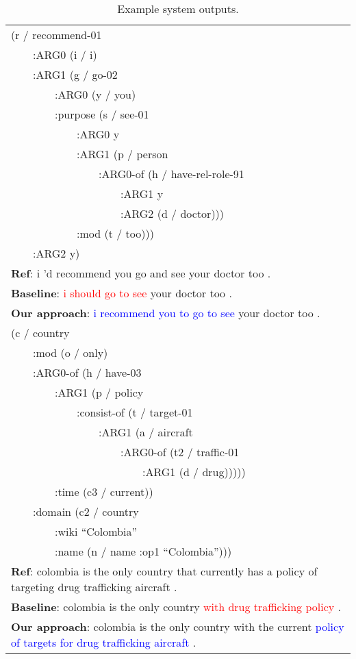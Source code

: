 \documentclass[11pt,a4paper]{article}
\begin{document}
\begin{table}[t!] \fontsize{10}{11} \selectfont
    \centering
    \begin{tabularx}{0.96\linewidth}{X}
     \toprule
     (r / recommend-01 \\
     ~~~~:ARG0 (i / i) \\
     ~~~~:ARG1 (g / go-02 \\
     ~~~~~~~~:ARG0 (y / you) \\
     ~~~~~~~~:purpose (s / see-01 \\
     ~~~~~~~~~~~~:ARG0 y \\
     ~~~~~~~~~~~~:ARG1 (p / person \\
     ~~~~~~~~~~~~~~~~:ARG0-of (h / have-rel-role-91 \\
     ~~~~~~~~~~~~~~~~~~~~:ARG1 y \\
     ~~~~~~~~~~~~~~~~~~~~:ARG2 (d / doctor))) \\
     ~~~~~~~~~~~~:mod (t / too))) \\
     ~~~~:ARG2 y) \\
     \textbf{Ref}: i 'd recommend you go and see your doctor too . \\
     \textbf{Baseline}: \textcolor{red}{i should go to see} your doctor too . \\
     \textbf{Our approach}: \textcolor{blue}{i recommend you to go to see} your doctor too . \\
     \midrule
     (c / country \\
     ~~~~:mod (o / only) \\
     ~~~~:ARG0-of (h / have-03 \\
     ~~~~~~~~:ARG1 (p / policy \\
     ~~~~~~~~~~~~:consist-of (t / target-01 \\
     ~~~~~~~~~~~~~~~~:ARG1 (a / aircraft \\
     ~~~~~~~~~~~~~~~~~~~~:ARG0-of (t2 / traffic-01 \\ 
     ~~~~~~~~~~~~~~~~~~~~~~~~:ARG1 (d / drug))))) \\
     ~~~~~~~~:time (c3 / current)) \\
     ~~~~:domain (c2 / country \\
     ~~~~~~~~:wiki ``Colombia'' \\
     ~~~~~~~~:name (n / name :op1 ``Colombia''))) \\
     \textbf{Ref}: colombia is the only country that currently has a policy of targeting drug trafficking aircraft .\\
     \textbf{Baseline}: colombia is the only country \textcolor{red}{with drug trafficking policy} .\\
     \textbf{Our approach}: colombia is the only country with the current \textcolor{blue}{policy of targets for drug trafficking aircraft} . \\
     \bottomrule
    \end{tabularx}
    \caption{Example system outputs.}
    \label{tab:case_study}
    \vspace{-1.0em}
\end{table}
\end{document}
